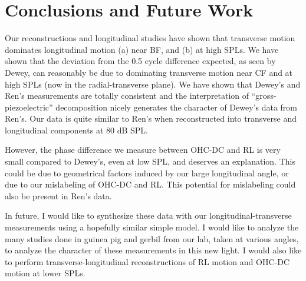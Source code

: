 \documentclass{article}
\begin{document}
\section{Conclusions and Future Work}
\par{Our reconstructions and longitudinal studies have shown that transverse motion dominates longitudinal motion (a) near BF, and (b) at high SPLs. We have shown that the deviation from the 0.5 cycle difference expected, as seen by Dewey, can reasonably be due to dominating transverse motion near CF and at high SPLs (now in the radial-transverse plane). We have shown that Dewey’s and Ren’s measurements are totally consistent and the interpretation of ``gross-piezoelectric” decomposition nicely generates the character of Dewey’s data from Ren’s. Our data is quite similar to Ren's when reconstructed into transverse and longitudinal components at 80 dB SPL.}
\par{However, the phase difference we measure between OHC-DC and RL is very small compared to Dewey's, even at low SPL, and deserves an explanation. This could be due to geometrical factors induced by our large longitudinal angle, or due to our mislabeling of OHC-DC and RL. This potential for mislabeling could also be present in Ren's data.}
\par{In future, I would like to synthesize these data with our longitudinal-transverse measurements using a hopefully similar simple model. I would like to analyze the many studies done in guinea pig and gerbil from our lab, taken at various angles, to analyze the character of these measurements in this new light. I would also like to perform transverse-longitudinal reconstructions of RL motion and OHC-DC motion at lower SPLs.}
\end{document}
